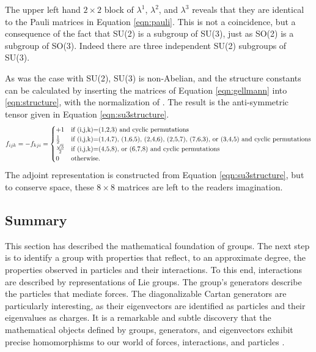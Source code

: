 The upper left hand $2\times2$ block of $\lambda^1$, $\lambda^2$, and $\lambda^3$ reveals that they are identical to the Pauli matrices in Equation \ref{eqn:pauli}.
This is not a coincidence, but a consequence of the fact that SU(2) is a subgroup of SU(3), just as SO(2) is a subgroup of SO(3).
Indeed there are three independent SU(2) subgroups of SU(3).

As was the case with SU(2), SU(3) is non-Abelian, and the structure constants can be calculated by inserting the matrices of Equation \ref{eqn:gellmann} into \ref{eqn:structure}, with the normalization of \half. 
The result is the anti-symmetric tensor given in Equation \ref{eqn:su3structure}. \check
\begin{equation}
\begin{split}\label{eqn:su3structure}
f_{ijk} =-f_{kji}= \begin{cases}
+1 &\text{if (i,j,k)=(1,2,3) and cyclic permutations}\\
\frac{1}{2} &\text{if (i,j,k)=(1,4,7), (1,6,5), (2,4,6), (2,5,7), (7,6,3), or (3,4,5) and cyclic permutations}\\
\frac{\sqrt{3}}{2} &\text{if (i,j,k)=(4,5,8), or (6,7,8) and cyclic permutations}\\
0 &\text{otherwise.}
\end{cases} 
\end{split}
\end{equation} 
The adjoint representation is constructed from Equation \ref{eqn:su3structure}, but to conserve space, these $8\times8$ matrices are left to the readers imagination.

\subsection{Summary}

This section has described the mathematical foundation of groups.
The next step is to identify a group with properties that reflect, to an approximate degree, the properties observed in particles and their interactions.
To this end, interactions are described by representations of Lie groups.
The group's generators describe the particles that mediate forces.
The diagonalizable Cartan generators are particularly interesting, as their eigenvectors are identified as particles and their eigenvalues as charges.
It is a remarkable and subtle discovery that the mathematical objects defined by groups, generators, and eigenvectors exhibit precise homomorphisms to our world of forces, interactions, and particles
\cite{robinson}.

